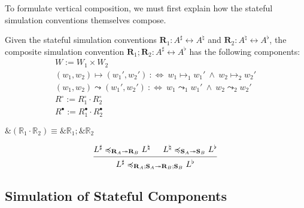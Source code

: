 \documentclass[acmsmall,screen,review,anonymous]{acmart}
\newcommand{\que}{\circ}
\newcommand{\ans}{\bullet}
\renewcommand{\preceq}{\preccurlyeq}
\begin{document}
To formulate vertical composition, we must first explain how
the stateful simulation conventions themselves compose.

\begin{definition} \label{def:sccomp}
Given the stateful simulation conventions
$\mathbf{R}_1 : A^\sharp \leftrightarrow A^\natural$ and
$\mathbf{R}_2 : A^\natural \leftrightarrow A^\flat$,
the composite simulation convention
$\mathbf{R}_1 \mathbin; \mathbf{R}_2 : A^\sharp \leftrightarrow A^\flat$
has the following components:
\begin{gather*}
  W := W_1 \times W_2 \\
  (w_1, w_2) \mapsto (w_1', w_2') \: :\Leftrightarrow \:
    w_1 \mapsto_1 w_1' \: \wedge \:
    w_2 \mapsto_2 w_2' \\
  (w_1, w_2) \leadsto (w_1', w_2') \: :\Leftrightarrow \:
    w_1 \leadsto_1 w_1' \: \wedge \:
    w_2 \leadsto_2 w_2' \\
  R^\que := R_1^\que \cdot R_2^\que \\
  R^\ans := R_1^\ans \cdot R_2^\ans
\end{gather*}
\end{definition}

\begin{lemma}
$ \&(\mathbb{R}_1 \cdot \mathbb{R}_2) \equiv
   \&\mathbb{R}_1 \mathop; \&\mathbb{R}_2 $
\end{lemma}

\begin{theorem} %
\[
  \begin{prooftree}
    \hypo{L^\sharp
      \preceq_{\mathbf{R}_A \twoheadrightarrow \mathbf{R}_B}
      L^\natural}
    \hypo{L^\natural
      \preceq_{\mathbf{S}_A \twoheadrightarrow \mathbf{S}_B}
      L^\flat}
    \infer2{L^\sharp
      \preceq_{\mathbf{R}_A \mathbin; \mathbf{S}_A \twoheadrightarrow
	   \mathbf{R}_B \mathbin; \mathbf{S}_B}
      L^\flat}
  \end{prooftree}
\]
\end{theorem}



\subsection{Simulation of Stateful Components} %
\end{document}
